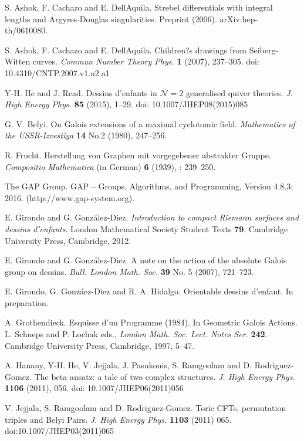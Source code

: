 \documentclass[12pt]{amsart}
\theoremstyle{remark}
\begin{document}
\begin{thebibliography}{99}
S. Ashok, F. Cachazo and E. DellAquila. 
Strebel differentials with integral lengths and Argyres-Douglas singularities. 
Preprint (2006). arXiv:hep-th/0610080.

S. Ashok, F. Cachazo and E. DellAquila.  
Children?s drawings from Seiberg-Witten curves. 
{\it Commun Number Theory Phys.} {\bf 1} (2007), 237--305. doi: 10.4310/CNTP.2007.v1.n2.a1

Y-H. He and J. Read. 
Dessins d'enfants in ${\mathcal N}=2$ generalised quiver theories. 
{\it J. High Energy Phys.} {\bf 85} (2015), 1--29. doi: 10.1007/JHEP08(2015)085

G. V. Belyi.
On Galois extensions of a maximal cyclotomic field.
{\it Mathematics of the USSR-Izvestiya} {\bf 14} No.2 (1980), 247--256.

R. Frucht.
Herstellung von Graphen mit vorgegebener abstrakter Gruppe.
{\it Compositio Mathematica} (in German) {\bf 6} (1939), : 239--250.

The GAP Group. GAP -- Groups, Algorithms, and Programming, Version 4.8.3; 2016. (http://www.gap-system.org).

E. Girondo and G. Gonz\'alez-Diez.
{\it Introduction to compact Riemann surfaces and dessins d'enfants}. 
London Mathematical Society Student Texts {\bf 79}. Cambridge University Press, Cambridge, 2012.

E. Girondo and G. Gonz\'alez-Diez.
A note on the action of the absolute Galois group on dessins.
{\it Bull. London Math. Soc.} {\bf 39} No. 5 (2007), 721--723.

E. Girondo, G. Gonz\'aez-Diez and R. A. Hidalgo.
Orientable dessins d'enfant.
In preparation.

A. Grothendieck.
Esquisse d'un Programme (1984). In Geometric Galois Actions. 
L. Schneps and P. Lochak eds., {\it London Math. Soc. Lect. Notes Ser.} {\bf 242}.
Cambridge University Press, Cambridge, 1997, 5--47.

A. Hanany, Y-H. He, V.  Jejjala, J. Pasukonis, S. Ramgoolam and D. Rodriguez-Gomez.
The beta ansatz: a tale of two complex structures. 
{\it J. High Energy Phys.} {\bf 1106} (2011), 056. doi: 10.1007/JHEP06(2011)056

V. Jejjala, S. Ramgoolam and D. Rodriguez-Gomez. 
Toric CFTs, permutation triples and Belyi Pairs. 
{\it J. High Energy Phys.} {\bf 1103} (2011) 065. doi:10.1007/JHEP03(2011)065


\end{thebibliography}
\end{document}

